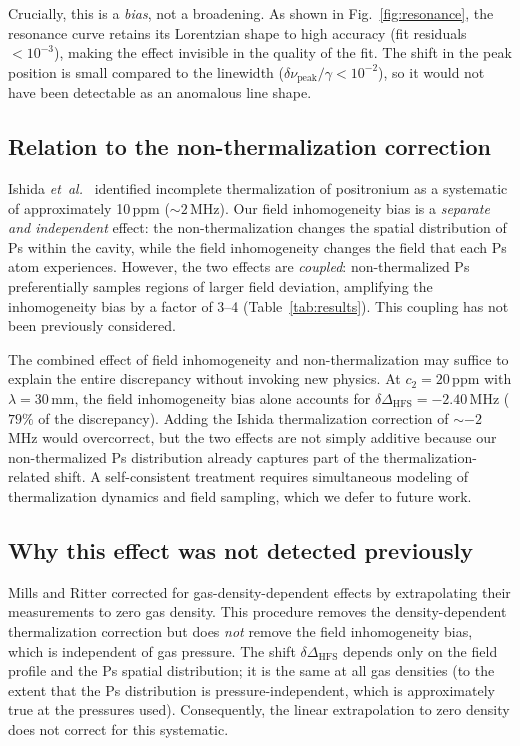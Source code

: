 \documentclass[twocolumn,pra,aps,superscriptaddress,floatfix,10pt]{revtex4-2}
\begin{document}
Crucially, this is a \emph{bias}, not a broadening. As shown in Fig.~\ref{fig:resonance}, the resonance curve retains its Lorentzian shape to high accuracy (fit residuals $< 10^{-3}$), making the effect invisible in the quality of the fit. The shift in the peak position is small compared to the linewidth ($\delta\nu_\mathrm{peak}/\gamma < 10^{-2}$), so it would not have been detectable as an anomalous line shape.

\subsection{Relation to the non-thermalization correction}

Ishida \textit{et~al.}~\cite{Ishida2014} identified incomplete thermalization of positronium as a systematic of approximately 10\,ppm ($\sim 2$\,MHz). Our field inhomogeneity bias is a \emph{separate and independent} effect: the non-thermalization changes the spatial distribution of Ps within the cavity, while the field inhomogeneity changes the field that each Ps atom experiences. However, the two effects are \emph{coupled}: non-thermalized Ps preferentially samples regions of larger field deviation, amplifying the inhomogeneity bias by a factor of 3--4 (Table~\ref{tab:results}). This coupling has not been previously considered.

The combined effect of field inhomogeneity and non-thermalization may suffice to explain the entire discrepancy without invoking new physics. At $c_2 = 20$\,ppm with $\lambda = 30$\,mm, the field inhomogeneity bias alone accounts for $\delta\Delta_\mathrm{HFS} = -2.40$\,MHz ($79\%$ of the discrepancy). Adding the Ishida thermalization correction of $\sim -2$\,MHz would overcorrect, but the two effects are not simply additive because our non-thermalized Ps distribution already captures part of the thermalization-related shift. A self-consistent treatment requires simultaneous modeling of thermalization dynamics and field sampling, which we defer to future work.

\subsection{Why this effect was not detected previously}

Mills and Ritter corrected for gas-density-dependent effects by extrapolating their measurements to zero gas density. This procedure removes the density-dependent thermalization correction but does \emph{not} remove the field inhomogeneity bias, which is independent of gas pressure. The shift $\delta\Delta_\mathrm{HFS}$ depends only on the field profile and the Ps spatial distribution; it is the same at all gas densities (to the extent that the Ps distribution is pressure-independent, which is approximately true at the pressures used). Consequently, the linear extrapolation to zero density does not correct for this systematic.
\end{document}
